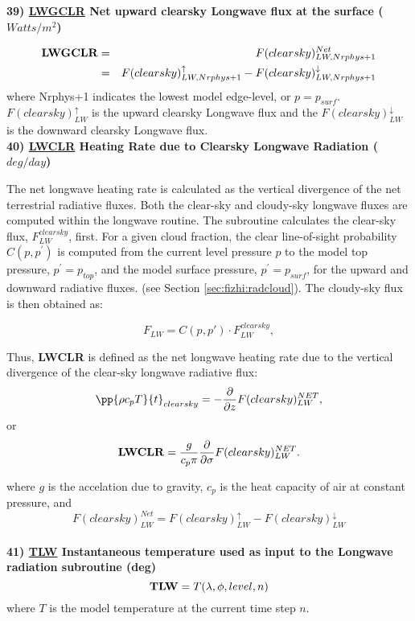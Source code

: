 \noindent
{\bf 39)  \underline {LWGCLR} Net upward clearsky Longwave flux at the surface ($Watts/m^2$) }

\noindent
\begin{eqnarray*}
{\bf LWGCLR} & =  & F(clearsky)_{LW,Nrphys+1}^{Net} \\
             & =  & F(clearsky)_{LW,Nrphys+1}^\uparrow - F(clearsky)_{LW,Nrphys+1}^\downarrow
\end{eqnarray*}
where Nrphys+1 indicates the lowest model edge-level, or $p = p_{surf}$.
$F(clearsky)_{LW}^\uparrow$ is
the upward clearsky Longwave flux and the $F(clearsky)_{LW}^\downarrow$ is the downward clearsky Longwave flux.
\\

\noindent
{\bf 40)  \underline {LWCLR} Heating Rate due to Clearsky Longwave Radiation ($deg/day$) }

\noindent
The net longwave heating rate is calculated as the vertical divergence of the
net terrestrial radiative fluxes.
Both the clear-sky and cloudy-sky longwave fluxes are computed within the
longwave routine.
The subroutine calculates the clear-sky flux, $F^{clearsky}_{LW}$, first.
For a given cloud fraction,
the clear line-of-sight probability $C(p,p^{\prime})$ is computed from the current level pressure $p$ 
to the model top pressure, $p^{\prime} = p_{top}$, and the model surface pressure, $p^{\prime} = p_{surf}$,
for the upward and downward radiative fluxes.
(see Section \ref{sec:fizhi:radcloud}).
The cloudy-sky flux is then obtained as:
   
\noindent
\[
F_{LW} = C(p,p') \cdot F^{clearsky}_{LW},
\]

\noindent
Thus, {\bf LWCLR} is defined as the net longwave heating rate due to the 
vertical divergence of the
clear-sky longwave radiative flux:
\[
\pp{\rho c_p T}{t}_{clearsky} = - {\partial \over \partial z} F(clearsky)_{LW}^{NET} ,
\]
or
\[
{\bf LWCLR} = \frac{g}{c_p \pi} {\partial \over \partial \sigma} F(clearsky)_{LW}^{NET} .
\]

\noindent
where $g$ is the accelation due to gravity,
$c_p$ is the heat capacity of air at constant pressure,
and
\[
F(clearsky)_{LW}^{Net} = F(clearsky)_{LW}^\uparrow - F(clearsky)_{LW}^\downarrow
\]
\\

 
\noindent
{\bf 41)  \underline {TLW} Instantaneous temperature used as input to the Longwave
 radiation subroutine (deg)}
\[
{\bf TLW}  = T(\lambda , \phi ,level, n)
\]
\noindent
where $T$ is the model temperature at the current time step $n$.
\\
 

